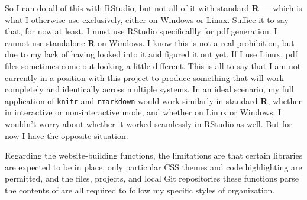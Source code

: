 \documentclass{article}\usepackage[]{graphicx}\usepackage[]{color}
\begin{document}
So I can do all of this with RStudio, but not all of it with standard \textbf{R} --- which is what I otherwise use exclusively, either on Windows or Linux.
Suffice it to say that, for now at least, I must use RStudio specificallly for pdf generation.
I cannot use standalone \textbf{R} on Windows. I know this is not a real prohibition, but due to my lack of having looked into it and figured it out yet.
If I use Linux, pdf files sometimes come out looking a little different.
This is all to say that I am not currently in a position with this project to produce something that will work completely and identically across multiple systems.
In an ideal scenario, my full application of \texttt{knitr} and \texttt{rmarkdown} would work similarly in standard \textbf{R}, whether in interactive or non-interactive mode, and whether on Linux or Windows.
I wouldn't worry about whether it worked seamlessly in RStudio as well.
But for now I have the opposite situation.

Regarding the website-building functions, the limitations are that certain libraries are expected to be in place,
only particular CSS themes and code highlighting are permitted, and the files, projects, and local Git repositories these functions parse the contents of are all required to follow my specific styles of organization.
\end{document}
